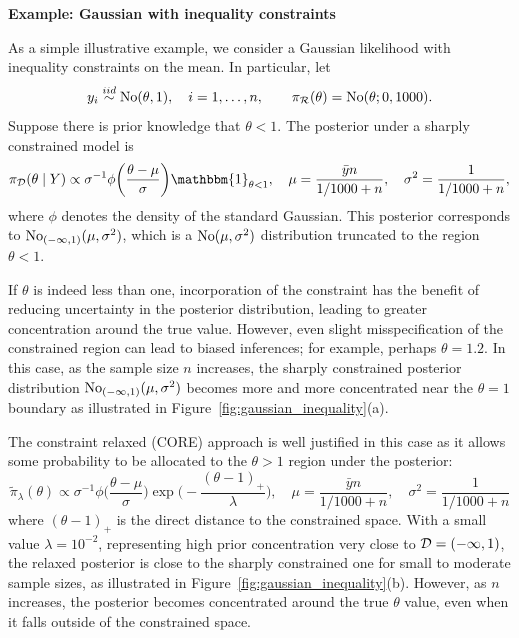\documentclass[10pt,fleqn]{article}
\DeclareMathOperator{\1}{\mathbbm{1}} \DeclareMathOperator{\bigO}{\mc O}
\begin{document}
{\noindent \textbf{Example: Gaussian with inequality constraints}}

As a simple illustrative example, we consider a Gaussian likelihood with inequality constraints on the mean.
In particular, let 
 $$y_i \stackrel{iid}{\sim} \operatorname{No}(\theta,1),\quad i =1,\ldots,n, \qquad \pi_\mathcal{R}(\theta) =\operatorname{No}(\theta; 0, 1000).$$ 
Suppose there is prior knowledge that $\theta<1$. The posterior under a sharply constrained model is
$$ \pi_{\mc D}(\theta \mid Y) \propto {\sigma^{-1}}\phi\bigg(\frac{\theta- \mu}{\sigma}\bigg) \mathbbm{1}_{\theta<1}, \quad \mu=    \frac{ \bar yn}{ 1/1000 + n },   \quad \sigma^2 = \frac{1}{ 1/1000 + n },$$
where $\phi$ denotes the density of the standard Gaussian. This posterior corresponds to 
$\operatorname{No}_{(-\infty,1)}(\mu,\sigma^2)$, which is a $\operatorname{No}(\mu,\sigma^2)$ distribution truncated to the region $\theta < 1$.

If $\theta$ is indeed less than one, incorporation of the constraint has the benefit of reducing uncertainty in the posterior distribution, leading to greater concentration around the true value.  However, even slight misspecification of the constrained region can lead to biased inferences; for example, perhaps $\theta=1.2.$
In this case, as the sample size $n$ increases, the sharply constrained posterior distribution $\operatorname{No}_{(-\infty,1)}(\mu,\sigma^2)$ becomes more and more concentrated near the $\theta=1$ boundary as illustrated in Figure~\ref{fig:gaussian_inequality}(a).

The constraint relaxed (CORE) approach is well justified in this case as it allows some probability to be allocated to the $\theta>1$ region under the posterior: 
$$ \tilde{\pi}_{\lambda}(\theta ) \propto {\sigma^{-1}}\phi\bigg(\frac{\theta- \mu}{\sigma}\bigg) \exp\bigg(-\frac{(\theta-1)_+ }{\lambda}\bigg) , \quad \mu=    \frac{ \bar y n}{ 1/1000 + n },   \quad \sigma^2 = \frac{1}{ 1/1000 + n }$$
where $(\theta-1)_+$ is the direct distance to the constrained space. With a small value $\lambda=10^{-2}$, representing high prior concentration very close to $\mathcal{D} = (-\infty,1)$, the relaxed posterior is close to 
the sharply constrained one for small to moderate sample sizes, as illustrated in Figure~\ref{fig:gaussian_inequality}(b).  However, as $n$ increases, the posterior becomes concentrated around the true $\theta$ value, even when it falls outside of the constrained space.
\end{document}
